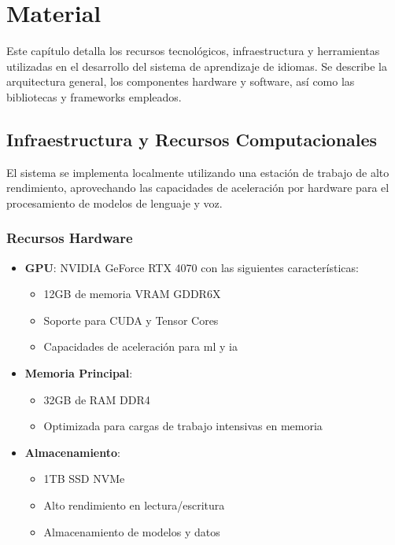 \chapter{Material}
\label{material}

Este capítulo detalla los recursos tecnológicos, infraestructura y herramientas utilizadas en el desarrollo del sistema de aprendizaje de idiomas. Se describe la arquitectura general, los componentes hardware y software, así como las bibliotecas y frameworks empleados.

\section{Infraestructura y Recursos Computacionales}

El sistema se implementa localmente utilizando una estación de trabajo de alto rendimiento, aprovechando las capacidades de aceleración por hardware para el procesamiento de modelos de lenguaje y voz.

\subsection{Recursos Hardware}

\begin{itemize}
	\item \textbf{GPU}: NVIDIA GeForce RTX 4070 con las siguientes características:
	      \begin{itemize}
		      \item 12GB de memoria VRAM GDDR6X
		      \item Soporte para CUDA y Tensor Cores
		      \item Capacidades de aceleración para \gls{ml} y \gls{ia}
	      \end{itemize}

	\item \textbf{Memoria Principal}:
	      \begin{itemize}
		      \item 32GB de RAM DDR4
		      \item Optimizada para cargas de trabajo intensivas en memoria
	      \end{itemize}

	\item \textbf{Almacenamiento}:
	      \begin{itemize}
		      \item 1TB SSD NVMe
		      \item Alto rendimiento en lectura/escritura
		      \item Almacenamiento de modelos y datos
	      \end{itemize}
\end{itemize}


